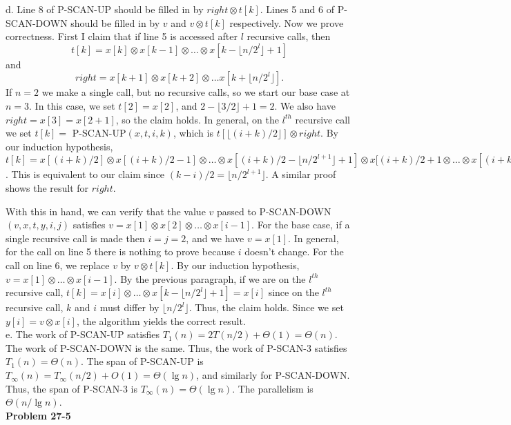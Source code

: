 \documentclass{article}
\begin{document}
d. Line 8 of P-SCAN-UP should be filled in by $right \otimes t[k]$.  Lines 5 and 6 of P-SCAN-DOWN should be filled in by $v$ and $v \otimes t[k]$ respectively.  Now we prove correctness.  First I claim that if line 5 is accessed after $l$ recursive calls, then 
\[t[k] = x[k] \otimes x[k-1] \otimes \ldots \otimes x[k-\lfloor n/2^l\rfloor + 1]\]
 and 
\[right = x[k+1] \otimes x[k+2] \otimes \ldots x[k+ \lfloor n/2^l \rfloor ].\]
If $n=2$ we make a single call, but no recursive calls, so we start our base case at $n=3$.  In this case, we set $t[2] = x[2]$, and $2-\lfloor3/2\rfloor+1 = 2$.  We also have $right = x[3] = x[2+1]$, so the claim holds.  In general, on the $l^{th}$ recursive call we set $t[k] = $ P-SCAN-UP$(x,t,i,k)$, which is $t[\lfloor (i+k)/2 \rfloor] \otimes right$. By our induction hypothesis, $t[k] = x[(i+k)/2] \otimes x[(i+k)/2 - 1] \otimes \ldots \otimes x[(i+k)/2 - \lfloor n/2^{l+1}\rfloor + 1] \otimes x[(i+k)/2 + 1 \otimes \ldots \otimes x[(i+k)/2 +   \lfloor n/2^{l+1}\rfloor]$.  This is equivalent to our claim since $(k-i)/2 =  \lfloor n/2^{l+1}\rfloor$. A similar proof shows the result for $right$.  

With this in hand, we can verify that the value $v$ passed to P-SCAN-DOWN$(v,x,t,y,i,j)$ satisfies $v = x[1] \otimes x[2] \otimes \ldots \otimes x[i-1]$.  For the base case, if a single recursive call is made then $i = j = 2$, and we have $v = x[1]$.  In general, for the call on line 5 there is nothing to prove because $i$ doesn't change.  For the call on line 6, we replace $v$ by $v \otimes t[k]$.  By our induction hypothesis, $v = x[1] \otimes \ldots \otimes x[i-1]$.  By the previous paragraph, if we are on the $l^{th}$ recursive call, $t[k] = x[i] \otimes \ldots \otimes x[k - \lfloor n/2^{l} \rfloor + 1] = x[i]$ since on the $l^{th}$ recursive call, $k$ and $i$ must differ by $\lfloor n/2^{l} \rfloor$. Thus, the claim holds.  Since we set $y[i] = v\otimes x[i]$, the algorithm yields the correct result. \\

e. The work of P-SCAN-UP satisfies $T_1(n) = 2T(n/2) + \Theta(1) = \Theta(n)$.  The work of P-SCAN-DOWN is the same.  Thus, the work of P-SCAN-3 satisfies $T_1(n) = \Theta(n)$. The span of P-SCAN-UP is $T_\infty(n) = T_\infty(n/2) + O(1) = \Theta(\lg n)$, and similarly for P-SCAN-DOWN.  Thus, the span of P-SCAN-3 is $T_\infty(n) = \Theta(\lg n)$.  The parallelism is $\Theta(n/\lg n)$. \\

\noindent\textbf{Problem 27-5}\\
\end{document}
